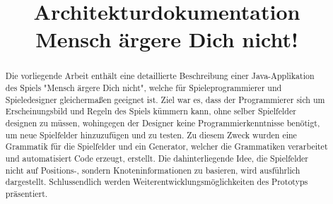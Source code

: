 \documentclass[conference]{IEEEtran}
\begin{document}
%
\title{Architekturdokumentation\\Mensch \"argere Dich nicht!}


\author{
\and
{}
}

\maketitle

\begin{abstract}
Die vorliegende Arbeit enth\"alt eine detaillierte Beschreibung einer Java-Applikation des Spiels "Mensch \"argere Dich nicht",
welche f\"ur Spieleprogrammierer und Spieledesigner gleicherma\ss en geeignet ist. Ziel war es, dass der Programmierer
sich um Erscheinungsbild und Regeln des Spiels k\"ummern kann, ohne selber Spielfelder designen zu m\"ussen, wohingegen der Designer keine
Programmierkenntnisse ben\"otigt, um neue Spielfelder hinzuzuf\"ugen und zu testen. Zu diesem Zweck wurden eine Grammatik f\"ur die Spielfelder
und ein Generator, welcher die Grammatiken verarbeitet und automatisiert Code erzeugt, erstellt. Die dahinterliegende Idee, die Spielfelder
nicht auf Positions-, sondern Knoteninformationen zu basieren, wird ausf\"uhrlich dargestellt.
Schlussendlich werden Weiterentwicklungsm\"oglichkeiten des Prototyps pr\"asentiert.
\end{abstract}

\IEEEpeerreviewmaketitle
\end{document}
